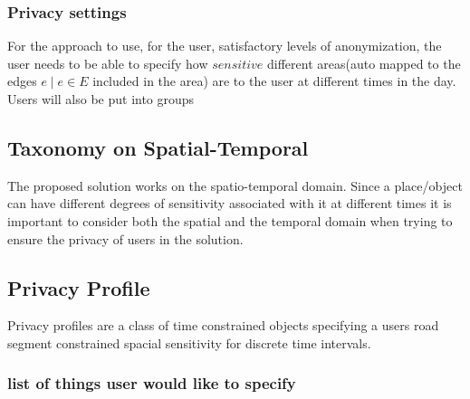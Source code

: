 \subsubsection{Privacy settings}
For the approach to use, for the user, satisfactory levels of anonymization, the user needs to be 
able to specify how $sensitive$ different areas(auto mapped to the edges $e \mid e \in E$ included in the area) are to the
user at different times in the day. Users will also be put into groups



\subsection{Taxonomy on Spatial-Temporal}
The proposed solution works on the spatio-temporal domain. 
Since a place/object can have different degrees of sensitivity associated with it at different 
times it is important to consider both the spatial and the temporal domain when trying to ensure 
the privacy of users in the solution.



\subsection{Privacy Profile}

Privacy profiles are a class of time constrained objects specifying a users road segment constrained
spacial sensitivity for discrete time intervals.


\subsubsection{list of things user would like to specify}

